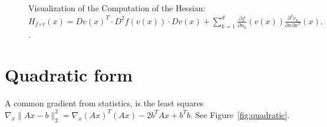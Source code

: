 \documentclass{article}
\newcommand{\drawgraph}[2]{
    \node[circle, draw, minimum size=0.5cm] (f{#1#2}) at (#1,#2+1) {f};
    \node[circle, draw, minimum size=0.5cm] (v{#1#2}) at (#1,#2) {v};
    \node[circle, draw, minimum size=0.5cm] (x{#1#2}) at (#1,#2-1) {x};
    
    \draw[->] (x{#1#2}) -- (v{#1#2});
    \draw[->] (v{#1#2}) -- (f{#1#2});
}
\begin{document}
\begin{figure}[h]
    \caption{Visualization of the Computation of the Hessian: \(
H_{f\circ v}(x) = Dv(x)^T \cdot D^2f(v(x)) \cdot Dv(x) + \sum_{k=1}^d \frac{\partial f}{\partial u_k}(v(x)) \frac{\partial^2 v_k}{\partial x \partial x^T}(x).
\).}
    \label{fig:hessian}
\end{figure}

\section{Quadratic form}
A common gradient from statistics, is the least squares $\nabla_x \|A x-b\|_2^2 = \nabla_x (Ax)^T(Ax) - 2b^TAx + b^Tb $.
See Figure~\ref{fig:quadratic}.
\end{document}
